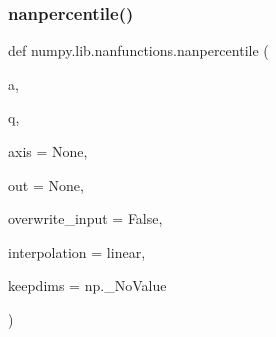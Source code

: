  \mbox{\label{namespacenumpy_1_1lib_1_1nanfunctions_a1fb5edb6795a7ac5109de2579da1dc03}} 
\subsubsection{\texorpdfstring{nanpercentile()}{nanpercentile()}}
{\footnotesize\ttfamily def numpy.\+lib.\+nanfunctions.\+nanpercentile (\begin{DoxyParamCaption}\item[{}]{a,  }\item[{}]{q,  }\item[{}]{axis = {\ttfamily None},  }\item[{}]{out = {\ttfamily None},  }\item[{}]{overwrite\+\_\+input = {\ttfamily False},  }\item[{}]{interpolation = {\ttfamily \textquotesingle{}linear\textquotesingle{}},  }\item[{}]{keepdims = {\ttfamily np.\+\_\+NoValue} }\end{DoxyParamCaption})}

